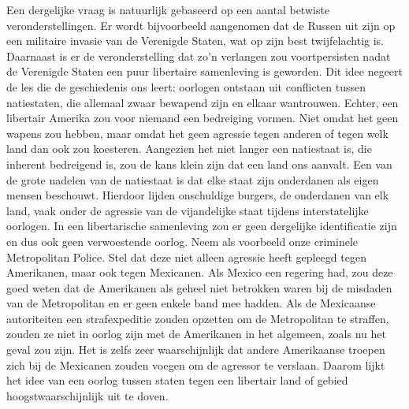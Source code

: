 \documentclass[
  a5paper,
  smalldemyvopaper,10pt,twoside,onecolumn,openright,extrafontsizes,hidelinks]{memoir}
\begin{document}
Een dergelijke vraag is natuurlijk gebaseerd op een aantal betwiste
veronderstellingen. Er wordt bijvoorbeeld aangenomen dat de Russen uit
zijn op een militaire invasie van de Verenigde Staten, wat op zijn best
twijfelachtig is. Daarnaast is er de veronderstelling dat zo'n verlangen
zou voortpersisten nadat de Verenigde Staten een puur libertaire
samenleving is geworden. Dit idee negeert de les die de geschiedenis ons
leert: oorlogen ontstaan uit conflicten tussen natiestaten, die allemaal
zwaar bewapend zijn en elkaar wantrouwen. Echter, een libertair Amerika
zou voor niemand een bedreiging vormen. Niet omdat het geen wapens zou
hebben, maar omdat het geen agressie tegen anderen of tegen welk land
dan ook zou koesteren. Aangezien het niet langer een natiestaat is, die
inherent bedreigend is, zou de kans klein zijn dat een land ons aanvalt.
Een van de grote nadelen van de natiestaat is dat elke staat zijn
onderdanen als eigen mensen beschouwt. Hierdoor lijden onschuldige
burgers, de onderdanen van elk land, vaak onder de agressie van de
vijandelijke staat tijdens interstatelijke oorlogen. In een
libertarische samenleving zou er geen dergelijke identificatie zijn en
dus ook geen verwoestende oorlog. Neem als voorbeeld onze criminele
Metropolitan Police. Stel dat deze niet alleen agressie heeft gepleegd
tegen Amerikanen, maar ook tegen Mexicanen. Als Mexico een regering had,
zou deze goed weten dat de Amerikanen als geheel niet betrokken waren
bij de misdaden van de Metropolitan en er geen enkele band mee hadden.
Als de Mexicaanse autoriteiten een strafexpeditie zouden opzetten om de
Metropolitan te straffen, zouden ze niet in oorlog zijn met de
Amerikanen in het algemeen, zoals nu het geval zou zijn. Het is zelfs
zeer waarschijnlijk dat andere Amerikaanse troepen zich bij de Mexicanen
zouden voegen om de agressor te verslaan. Daarom lijkt het idee van een
oorlog tussen staten tegen een libertair land of gebied
hoogstwaarschijnlijk uit te doven.
\end{document}
